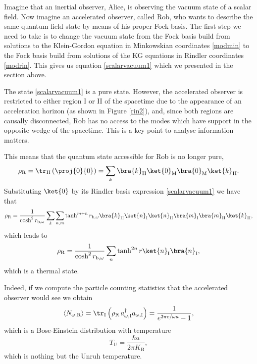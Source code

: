 Imagine that an inertial observer, Alice, is observing the vacuum state of a scalar field. Now imagine an accelerated observer, called Rob, who wants to describe the same quantum field state by means of his proper Fock basis. The first step we need to take is to change the vacuum state from the Fock basis build from solutions to the Klein-Gordon equation in Minkowskian coordinates \eqref{modmin} to the Fock basis build from solutions of the KG equations in Rindler coordinates \eqref{modrin}. This gives us equation \eqref{scalarvacuum1} which we presented in the section above.

The state \eqref{scalarvacuum1} is a pure state. However, the accelerated observer is restricted to either region I or II of the spacetime due to the appearance of an acceleration horizon (as shown in Figure \ref{rin2}), and, since both regions are causally disconnected, Rob has no access to the modes which have support in the opposite wedge of the spacetime. This is a key point to analyse information matters. 

This means that the quantum state accessible for Rob is no longer pure,
\begin{equation}
\rho_{\text{R}}=\tr_{\text{II}}\left(\proj{0}{0}\right)=\sum_{k}\bra{k}_{\text{II}}\ket{0}_\text{M}\bra{0}_\text{M}\ket{k}_{\text{II}}.
\end{equation}
Substituting $\ket{0}$ by its Rindler basis expression \eqref{scalarvacuum1} we have that
\begin{equation}
\rho_{\text{R}}=\frac{1}{\cosh^2 r_{\text{b},\omega}}\sum_k\sum_{n,m}\tanh^{m+n}r_{\text{b},\omega}\bra{k}_{\text{II}}\ket{n}_\text{I}\ket{n}_{\text{II}}\bra{m}_\text{I}\bra{m}_{\text{II}}\ket{k}_{\text{II}},
\end{equation}
which leads to
\begin{equation}\label{thermal}
\rho_{\text{R}}=\frac{1}{\cosh^2 r_{\text{b},\omega}}\sum_n\tanh^{2n}r\ket{n}_\text{I}\bra{n}_\text{I},
\end{equation}
which is a thermal state.

Indeed, if we compute the particle counting statistics that the accelerated observer would see we obtain
\begin{equation}
\langle N_{\omega,\text{R}}\rangle=\tr_{\text{I}}\left(\rho_\text{R}\,a^\dagger_{\omega,\text{I}}a_{\omega,\text{I}}\right)=\frac{1}{e^{2\pi c/\omega a}-1},
\end{equation}
which is a Bose-Einstein distribution with temperature
\begin{equation}
T_\text{U}=\frac{\hbar a}{2\pi K_\text{B}},
\end{equation}
which is nothing but the Unruh temperature.

